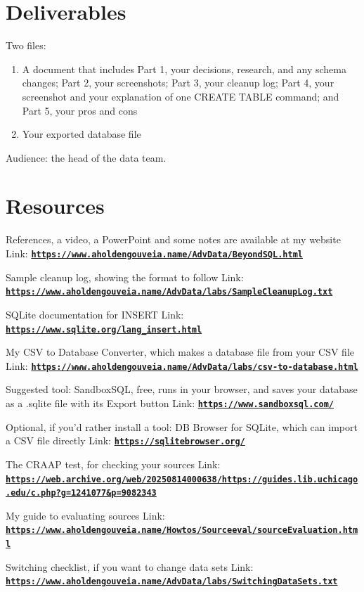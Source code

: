\documentclass[12pt]{article}
\begin{document}
\section*{Deliverables}
Two files:
\begin{enumerate}
    \item A document that includes Part 1, your decisions, research, and any schema changes; Part 2, your screenshots; Part 3, your cleanup log; Part 4, your screenshot and your explanation of one CREATE TABLE command; and Part 5, your pros and cons
    \item Your exported database file
\end{enumerate}

Audience: the head of the data team.

\section*{Resources}
References, a video, a PowerPoint and some notes are available at my website
Link: \href{https://www.aholdengouveia.name/AdvData/BeyondSQL.html}{\textbf{\nolinkurl{https://www.aholdengouveia.name/AdvData/BeyondSQL.html}}}

Sample cleanup log, showing the format to follow
Link: \href{https://www.aholdengouveia.name/AdvData/labs/SampleCleanupLog.txt}{\textbf{\nolinkurl{https://www.aholdengouveia.name/AdvData/labs/SampleCleanupLog.txt}}}

SQLite documentation for INSERT
Link: \href{https://www.sqlite.org/lang_insert.html}{\textbf{\nolinkurl{https://www.sqlite.org/lang_insert.html}}}

My CSV to Database Converter, which makes a database file from your CSV file
Link: \href{https://www.aholdengouveia.name/AdvData/labs/csv-to-database.html}{\textbf{\nolinkurl{https://www.aholdengouveia.name/AdvData/labs/csv-to-database.html}}}

Suggested tool: SandboxSQL, free, runs in your browser, and saves your database as a .sqlite file with its Export button
Link: \href{https://www.sandboxsql.com/}{\textbf{\nolinkurl{https://www.sandboxsql.com/}}}

Optional, if you'd rather install a tool: DB Browser for SQLite, which can import a CSV file directly
Link: \href{https://sqlitebrowser.org/}{\textbf{\nolinkurl{https://sqlitebrowser.org/}}}

The CRAAP test, for checking your sources
Link: \href{https://web.archive.org/web/20250814000638/https://guides.lib.uchicago.edu/c.php?g=1241077&p=9082343}{\textbf{\nolinkurl{https://web.archive.org/web/20250814000638/https://guides.lib.uchicago.edu/c.php?g=1241077&p=9082343}}}

My guide to evaluating sources
Link: \href{https://www.aholdengouveia.name/Howtos/Sourceeval/sourceEvaluation.html}{\textbf{\nolinkurl{https://www.aholdengouveia.name/Howtos/Sourceeval/sourceEvaluation.html}}}

Switching checklist, if you want to change data sets
Link: \href{https://www.aholdengouveia.name/AdvData/labs/SwitchingDataSets.txt}{\textbf{\nolinkurl{https://www.aholdengouveia.name/AdvData/labs/SwitchingDataSets.txt}}}
\end{document}
